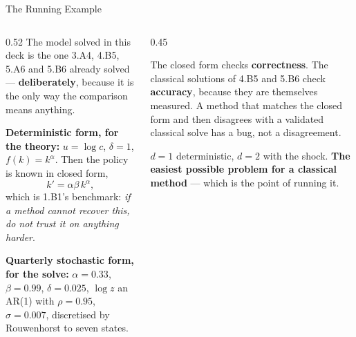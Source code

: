 \begin{frame}{The Running Example}
\begin{columns}[T]
\begin{column}{0.52\textwidth}
\small
The model solved in this deck is the one 3.A4, 4.B5, 5.A6 and 5.B6 already solved --- \textbf{deliberately}, because it is the only way the comparison means anything.
\medskip

\textbf{Deterministic form, for the theory:} $u=\log c$, $\delta=1$, $f(k)=k^{\alpha}$. Then the policy is known in closed form,
\[
  k'=\alpha\beta\,k^{\alpha},
\]
which is 1.B1's benchmark: \emph{if a method cannot recover this, do not trust it on anything harder}.
\medskip

\textbf{Quarterly stochastic form, for the solve:} $\alpha=0.33$, $\beta=0.99$, $\delta=0.025$, $\log z$ an AR(1) with $\rho=0.95$, $\sigma=0.007$, discretised by Rouwenhorst to seven states.
\end{column}
\begin{column}{0.45\textwidth}
\begin{takeawaybox}[title=\textbf{Two grounds truths}]\small
The closed form checks \textbf{correctness}. The classical solutions of 4.B5 and 5.B6 check \textbf{accuracy}, because they are themselves measured.
\medskip
A method that matches the closed form and then disagrees with a validated classical solve has a bug, not a disagreement.
\end{takeawaybox}
\medskip
{\footnotesize $d=1$ deterministic, $d=2$ with the shock. \textbf{The easiest possible problem for a classical method} --- which is the point of running it.}
\end{column}
\end{columns}
\vspace{1mm}
\end{frame}

